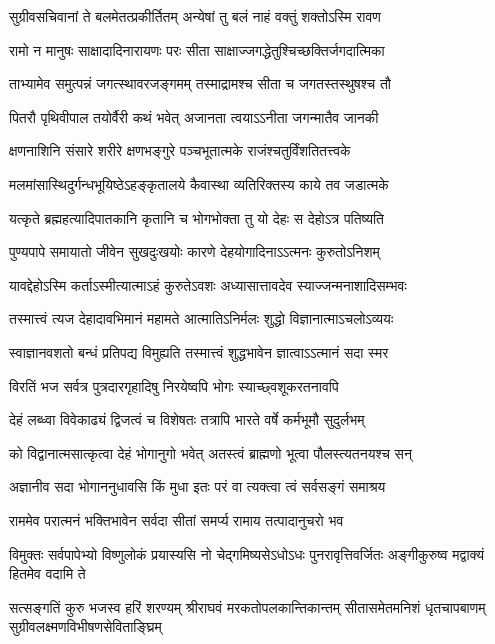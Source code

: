 \twolineshloka
{सुग्रीवसचिवानां ते बलमेतत्प्रकीर्तितम्}
{अन्येषां तु बलं नाहं वक्तुं शक्तोऽस्मि रावण} %

\twolineshloka
{रामो न मानुषः साक्षादादिनारायणः परः}
{सीता साक्षाज्जगद्धेतुश्चिच्छक्तिर्जगदात्मिका} %

\twolineshloka
{ताभ्यामेव समुत्पन्नं जगत्स्थावरजङ्गमम्}
{तस्माद्रामश्च सीता च जगतस्तस्थुषश्च तौ} %

\twolineshloka
{पितरौ पृथिवीपाल तयोर्वैरी कथं भवेत्}
{अजानता त्वयाऽऽनीता जगन्मातैव जानकी} %

\twolineshloka
{क्षणनाशिनि संसारे शरीरे क्षणभङ्गुरे}
{पञ्चभूतात्मके राजंश्चतुर्विंशतितत्त्वके} %

\twolineshloka
{मलमांसास्थिदुर्गन्धभूयिष्ठेऽहङ्कृतालये}
{कैवास्था व्यतिरिक्तस्य काये तव जडात्मके} %

\twolineshloka
{यत्कृते ब्रह्महत्यादिपातकानि कृतानि च}
{भोगभोक्ता तु यो देहः स देहोऽत्र पतिष्यति} %

\twolineshloka
{पुण्यपापे समायातो जीवेन सुखदुःखयोः}
{कारणे देहयोगादिनाऽऽत्मनः कुरुतोऽनिशम्} %

\twolineshloka
{यावद्देहोऽस्मि कर्ताऽस्मीत्यात्माऽहं कुरुतेऽवशः}
{अध्यासात्तावदेव स्याज्जन्मनाशादिसम्भवः} %

\twolineshloka
{तस्मात्त्वं त्यज देहादावभिमानं महामते}
{आत्मातिऽनिर्मलः शुद्धो विज्ञानात्माऽचलोऽव्ययः} %

\twolineshloka
{स्वाज्ञानवशतो बन्धं प्रतिपद्य विमुह्यति}
{तस्मात्त्वं शुद्धभावेन ज्ञात्वाऽऽत्मानं सदा स्मर} %

\twolineshloka
{विरतिं भज सर्वत्र पुत्रदारगृहादिषु}
{निरयेष्वपि भोगः स्याच्छ्वशूकरतनावपि} %

\twolineshloka
{देहं लब्ध्वा विवेकाढ्यं द्विजत्वं च विशेषतः}
{तत्रापि भारते वर्षे कर्मभूमौ सुदुर्लभम्} %

\twolineshloka
{को विद्वानात्मसात्कृत्वा देहं भोगानुगो भवेत्}
{अतस्त्वं ब्राह्मणो भूत्वा पौलस्त्यतनयश्च सन्} %

\twolineshloka
{अज्ञानीव सदा भोगाननुधावसि किं मुधा}
{इतः परं वा त्यक्त्वा त्वं सर्वसङ्गं समाश्रय} %

\twolineshloka
{राममेव परात्मनं भक्तिभावेन सर्वदा}
{सीतां समर्प्य रामाय तत्पादानुचरो भव} %

\threelineshloka
{विमुक्तः सर्वपापेभ्यो विष्णुलोकं प्रयास्यसि}
{नो चेद्गमिष्यसेऽधोऽधः पुनरावृत्तिवर्जितः}
{अङ्गीकुरुष्व मद्वाक्यं हितमेव वदामि ते} %

\fourlineindentedshloka
{सत्सङ्गतिं कुरु भजस्व हरिं शरण्यम्}
{श्रीराघवं मरकतोपलकान्तिकान्तम्}
{सीतासमेतमनिशं धृतचापबाणम्}
{सुग्रीवलक्ष्मणविभीषणसेविताङ्घ्रिम्} %

